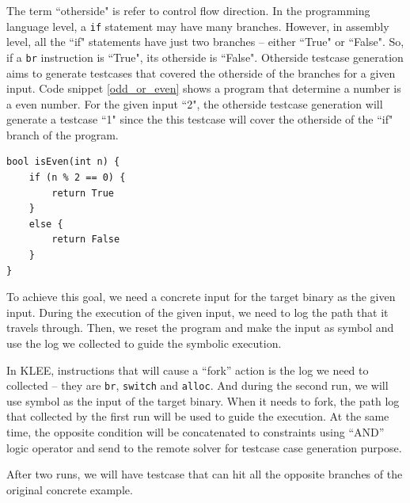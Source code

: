 The term ``otherside" is refer to control flow direction. In the programming language level, a \texttt{if} statement may have many branches. However, in assembly level, all the ``if" statements have just two branches -- either ``True" or ``False". So, if a \texttt{br} instruction is ``True", its otherside is ``False". Otherside testcase generation aims to generate testcases that covered the otherside of the branches for a given input. Code snippet \ref{odd_or_even} shows a program that determine a number is a even number. For the given input ``2", the otherside testcase generation will generate a testcase ``1" since the this testcase will cover the otherside of the ``if" branch of the program.

\begin{spacing}{1}
{
\begin{lstlisting}[frame=shadowbox, caption={Is Even},label={odd_or_even}]
bool isEven(int n) {
    if (n % 2 == 0) {
        return True
    }
    else {
        return False
    }
}
\end{lstlisting}
}
\end{spacing}
\pagebreak
To achieve this goal, we need a concrete input for the target binary as the given input. During the execution of the given input, we need to log the path that it travels through. Then, we reset the program and make the input as symbol and use the log we collected to guide the symbolic execution.

In KLEE, instructions that will cause a ``fork'' action is the log we need to collected -- they are \texttt{br}, \texttt{switch} and \texttt{alloc}. And during the second run, we will use symbol as the input of the target binary. When it needs to fork, the path log that collected by the first run will be used to guide the execution. At the same time, the opposite condition will be concatenated to constraints using ``AND'' logic operator and send to the remote solver for testcase case generation purpose.

After two runs, we will have testcase that can hit all the opposite branches of the original concrete example.